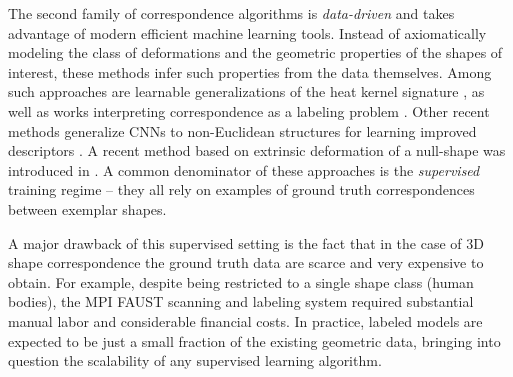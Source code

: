\documentclass[10pt,twocolumn,letterpaper]{article}
\newcommand\comment[1]{{}}
\begin{document}
The second family of correspondence algorithms is \emph{data-driven} and takes advantage of modern efficient machine learning tools. 
Instead of axiomatically modeling the class of deformations and the geometric properties of the shapes of interest, these methods infer such properties from the data themselves. 
Among such approaches are learnable generalizations of the heat kernel signature \cite{litman2014learning}, as well as works interpreting correspondence as a labeling problem \cite{rodola2014dense}. Other recent methods generalize CNNs to non-Euclidean structures for learning improved descriptors \cite{monet, boscaini2016learning}. A recent method based on extrinsic deformation of a null-shape was introduced in \cite{groueix2018b}.  
A common denominator of these approaches is the \emph{supervised} training regime -- they all rely on examples of ground truth correspondences between exemplar shapes.  

A major drawback of this supervised setting is the fact that in the case of 3D shape correspondence the ground truth data are scarce and very expensive to obtain.
For example, despite being restricted to a single shape class (human bodies), the MPI FAUST scanning and labeling system \cite{dfaust:CVPR:2017} required substantial manual labor and considerable financial costs. 
In practice, labeled models are expected to be just a small fraction of the existing geometric data, bringing into question the scalability of any supervised learning algorithm. 


\comment{
The effort involved in annotating such data could make sense at the object level, or maybe parts level. 
But, annotating at a high resolution of point to point matching is  too expensive and actually impractical; this calls for the design of techniques that would allow less supervision.
 We propose an unsupervised scheme to learn shape correspondence which does not rely on ground-truth labeling but rather on few axioms that encapsulate our knowledge about the nature of an admittable correspondence. 
 Our adopted axioms reflect the expectation that the desired correspondence preserve the metric and topological properties between the deformed shapes \cite{elad2003bending,bronstein-face}. 
 A given correspondence that consistently satisfies these axioms is expected to be the true correspondence. 
 While such axioms are conceptually easy to formulate, it is generally hard to find the correspondence that fulfills them using traditional optimization techniques. 
 The power of a deep learning approach is revealed as being a powerful optimization tool. 
 In our case we show how axioms replace the need of external ground truth data. 
 
 The proposed method is expected to work as long as we can construct a model that describes the properties of the desired correspondence.
As an example, in this paper, we suggest to treat shapes of the same subject under various poses as being isometrically similar. 

}
\end{document}
